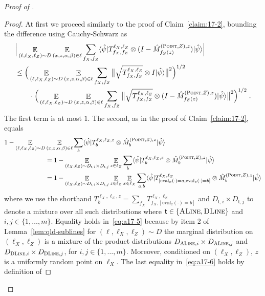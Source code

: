 \documentclass[11pt]{article}
\theoremstyle{definition}
\newcommand{\ket}[1]{|#1\rangle}
\newcommand{\bra}[1]{\langle#1|}
\newcommand{\Id}{\ensuremath{I}}
\newcommand{\ot}{\otimes}
\newcommand{\E}{\mathop{\mathbb{E}}\displaylimits}
\newcommand{\tvarstyle}[1]{\mathsf{#1}}
\newcommand{\tvar}{\ensuremath{\tvarstyle{t}}}
\newcommand{\typestyle}[1]{\ensuremath{\textsc{#1}}\xspace}
\renewcommand{\line}{\mathbf{\ell}}
\newcommand{\Point}{\typestyle{Point}}
\newcommand{\ALine}{\typestyle{ALine}}
\newcommand{\DLine}{\typestyle{DLine}}
\newcommand{\eval}{\mathrm{eval}}
\begin{document}
\begin{proof}[Proof of ]
\begin{proof}
At first we proceed similarly to the proof of Claim~\ref{claim:17-2}, bounding the difference using Cauchy-Schwarz as
\begin{align*}
&\Big| \E_{(\line, \line_X, \line_Z) \sim D} \E_{(x,z,\alpha, \beta) \in \line} \sum_{f_X,f_Z} \bra{\hat{\psi}} T^{\line_X, \line_Z}_{f_X, f_Z} \ot  (\Id-\hat{M}^{(\Point,Z),z}_{f_Z(z)}) \ket{\hat{\psi}}\Big|\\
&\leq\Big(\E_{(\line, \line_X, \line_Z) \sim D} \E_{(x,z,\alpha, \beta) \in \line} \sum_{f_X, f_Z} \big\| \sqrt{ T^{\line_X, \line_Z}_{f_X, f_Z}} \ot  \Id \ket{\hat{\psi}}\big\|^2 \Big)^{1/2}\\
&\qquad\cdot \Big(\E_{(\line, \line_X, \line_Z) \sim D} \E_{(x,z,\alpha, \beta) \in \line} \sum_{f_X, f_Z} \big\| \sqrt{ T^{\line_X, \line_Z}_{f_X, f_Z}} \ot  (\Id-\hat{M}^{(\Point,Z),z}_{f_Z(z)}) \ket{\hat{\psi}}\big\|^2 \Big)^{1/2}\;.
\end{align*}
The first term is at most $1$. The second, as in the proof of Claim~\ref{claim:17-2}, equals
\begin{align}
1-\E_{(\line, \line_X, \line_Z) \sim D} &\E_{(x,z,\alpha, \beta) \in \line} \sum_{b} \bra{\hat{\psi}}  T^{\line_X, \line_Z, z}_{b} \ot \hat{M}^{(\Point,Z),z}_{b} \ket{\hat{\psi}}\notag\\
&=1-\E_{(\line_X,\line_Z)\sim D_{\tvar,i}\times D_{\tvar,j}}
\E_{z\in \line_Z } \sum_{b} \bra{\hat{\psi}}  T^{\line_X, \line_Z, z}_{b}  \ot \hat{M}^{(\Point,Z),z}_{b} \ket{\hat{\psi}}\label{eq:a17-5}\\
&=1-\E_{(\line_X,\line_Z)\sim D_{\tvar,i}\times D_{\tvar,j}}
\E_{z\in \line_Z }\E_{x\in \line_X} \sum_{a,b} \bra{\hat{\psi}}  T^{\line_X, \line_Z}_{[\eval_x(\cdot)=a,\eval_z(\cdot)=b]}  \ot \hat{M}^{(\Point,Z),z}_{b} \ket{\hat{\psi}}\label{eq:a17-6}
\end{align}
where we use the shorthand $T^{\line_X, \line_Z, z}_{b} = \sum_{f_X} T^{\line_X, \line_Z}_{f_X,[\eval_z(\cdot)=b]}$ and $D_{\tvar,i}\times D_{\tvar,j}$ to denote a mixture over all such distributions where $\tvar\in\{\ALine,\DLine\}$ and $i,j\in\{1,\ldots,m\}$. Equality holds in~\eqref{eq:a17-5} because by item 2 of Lemma~\ref{lem:qld-sublines} for $(\ell,\ell_X,\ell_Z)\sim D$ the marginal distribution on $(\ell_X,\ell_Z)$ is a mixture of the product distributions  $D_{\ALine, i}\times D_{\ALine, j}$ and $D_{\DLine, i}\times D_{\DLine,j}$, for $i,j\in \{1,\ldots,m\}$. Moreover, conditioned on $(\ell_X,\ell_Z)$, $z$ is a uniformly random point on $\ell_X$. The last equality in~\eqref{eq:a17-6} holds by definition of 

\end{proof}
\end{proof}
\end{document}
